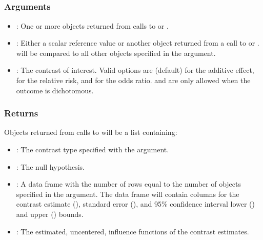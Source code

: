 \documentclass[]{jss}
\begin{document}
\subsection[lmtp_contrast]{}

\subsubsection{Arguments}

\begin{itemize}

  \item {}: One or more objects returned from calls to  or .
  \item {}: Either a scalar reference value or another object returned from a call
  to  or .  will be compared to all other objects
  specified in the  argument.
  \item {}: The contrast of interest. Valid options are  (default)
  for the additive effect,  for the relative risk, and  for the odds
  ratio.  and  are only allowed when the outcome is dichotomous.
  
\end{itemize}

\subsubsection{Returns}

Objects returned from calls to  will be a list containing:

\begin{itemize}

  \item {}: The contrast type specified with the  argument.
  \item {}: The null hypothesis.
  \item {}: A data frame with the number of rows equal to the number
  of objects specified in the  argument. The data frame will contain
  columns for the contrast estimate (), standard error (),
  and 95\% confidence interval lower () and upper () bounds.
  \item {}: The estimated, uncentered, influence functions of the contrast estimates.
  
\end{itemize}
\end{document}
